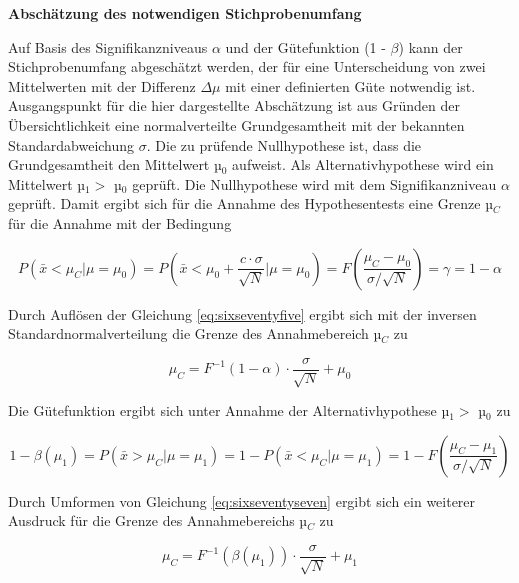 {\selectfont
\noindent\textbf{Absch\"{a}tzung des notwendigen Stichprobenumfang}}\smallskip

\noindent Auf Basis des Signifikanzniveaus $\alpha$ und der G\"{u}tefunktion (1 - $\beta$) kann der Stichprobenumfang abgesch\"{a}tzt werden, der f\"{u}r eine Unterscheidung von zwei Mittelwerten mit der Differenz $\Delta\mu$ mit einer definierten G\"{u}te notwendig ist. Ausgangspunkt f\"{u}r die hier dargestellte Absch\"{a}tzung ist aus Gr\"{u}nden der \"{U}bersichtlichkeit eine normalverteilte Grundgesamtheit mit der bekannten Standardabweichung $\sigma$. Die zu pr\"{u}fende Nullhypothese ist, dass die Grundgesamtheit den Mittelwert µ$_{0}$ aufweist. Als Alternativhypothese wird ein Mittelwert µ$_{1} >$ µ$_{0}$ gepr\"{u}ft. Die Nullhypothese wird mit dem Signifikanzniveau $\alpha$ gepr\"{u}ft. Damit ergibt sich f\"{u}r die Annahme des Hypothesentests eine Grenze µ$_{C}$ f\"{u}r die Annahme mit der Bedingung

\begin{equation}\label{eq:sixseventyfive}
P\left(\bar{x}<\mu _{C} |\mu =\mu _{0} \right)=P\left(\bar{x}<\mu _{0} +\dfrac{c\cdot \sigma }{\sqrt{N} } |\mu =\mu _{0} \right)=F\left(\dfrac{\mu _{C} -\mu _{0} }{\sigma /\sqrt{N}} \right)=\gamma =1-\alpha
\end{equation}

\noindent Durch Aufl\"{o}sen der Gleichung \eqref{eq:sixseventyfive} ergibt sich mit der inversen Standardnormalverteilung die Grenze des Annahmebereich µ$_{C}$ zu

\begin{equation}\label{eq:sixseventysix}
\mu _{C} =F^{-1} \left(1-\alpha \right)\cdot \dfrac{\sigma }{\sqrt{N}} +\mu _{0}
\end{equation}

\noindent Die G\"{u}tefunktion ergibt sich unter Annahme der Alternativhypothese µ$_{1} >$ µ$_{0}$ zu

\begin{equation}\label{eq:sixseventyseven}
1-\beta \left(\mu _{1} \right)=P\left(\bar{x}>\mu _{C} |\mu =\mu _{1} \right)=1-P\left(\bar{x}<\mu _{C} |\mu =\mu _{1} \right)=1-F\left(\dfrac{\mu _{C} -\mu _{1} }{\sigma /\sqrt{N} } \right)
\end{equation}

\noindent Durch Umformen von Gleichung \eqref{eq:sixseventyseven} ergibt sich ein weiterer Ausdruck f\"{u}r die Grenze des Annahmebereichs µ$_{C}$ zu

\begin{equation}\label{eq:sixseventyeight}
\mu _{C} =F^{-1} \left(\beta \left(\mu _{1} \right)\right)\cdot \dfrac{\sigma }{\sqrt{N} } +\mu _{1}
\end{equation}

